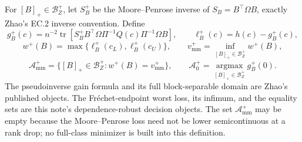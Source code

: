 For \([B]_+\in\mathcal B_Z^+\), let \(S_B^+\) be the Moore--Penrose inverse of \(S_B=B^{\top}\Omega B\), exactly Zhao's EC.2 inverse convention.  Define
\[
g_B^+(c)=n^{-2}\operatorname{tr}\!\left[S_B^+B^{\top}\Omega\Pi^{-1}Q(c)\Pi^{-1}\Omega B\right],
\qquad \ell_B^+(c)=h(c)-g_B^+(c),
\]
\[
w^+(B)=\max\{\ell_B^+(c_L),\ell_B^+(c_U)\},
\qquad v_{\mathrm{mm}}^+=\inf_{[B]_+\in\mathcal B_Z^+}w^+(B),
\]
\[
\mathcal A_{\mathrm{mm}}^+=\{[B]_+\in\mathcal B_Z^+:w^+(B)=v_{\mathrm{mm}}^+\},
\qquad \mathcal A_0^+=\operatorname*{argmax}_{[B]_+\in\mathcal B_Z^+}g_B^+(0).
\]
The pseudoinverse gain formula and its full block-separable domain are Zhao's published objects.  The Fr\'echet-endpoint worst loss, its infimum, and the equality sets are this note's dependence-robust decision objects.  The set \(\mathcal A_{\mathrm{mm}}^+\) may be empty because the Moore--Penrose loss need not be lower semicontinuous at a rank drop; no full-class minimizer is built into this definition.